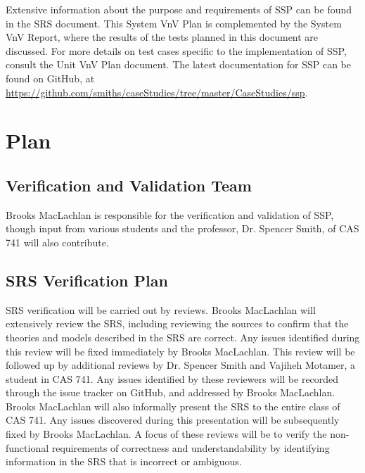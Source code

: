 \documentclass[12pt, titlepage]{article}
\newcommand{\progname}{SSP}
\begin{document}
\noindent Extensive information about the purpose and requirements of 
\progname{} can be found in the SRS document. This System VnV Plan is 
complemented by the System VnV Report, where the results of the tests planned 
in this document are discussed. For more details on test cases specific to the 
implementation of \progname{}, consult the Unit VnV Plan document. The latest 
documentation for \progname{} can be found on GitHub, at \newline 
\href{https://github.com/smiths/caseStudies/tree/master/CaseStudies/ssp}{https://github.com/smiths/caseStudies/tree/master/CaseStudies/ssp}.

\section{Plan} \label{sec_Plan}
	
\subsection{Verification and Validation Team}

\noindent Brooks MacLachlan is responsible for the verification and validation 
of \progname{}, though input from various students and the professor, Dr. 
Spencer 
Smith, of CAS 741 will also contribute.

\subsection{SRS Verification Plan}

\noindent SRS verification will be carried out by reviews. Brooks MacLachlan 
will extensively review the SRS, including reviewing the sources to confirm 
that the theories and models described in the SRS are correct. Any issues 
identified during this review will be fixed immediately by Brooks MacLachlan. 
This review will be followed up by additional reviews by Dr. Spencer Smith and 
Vajiheh Motamer, a student in CAS 741. Any issues identified by these reviewers 
will be recorded through the issue tracker on GitHub, and addressed by Brooks 
MacLachlan. Brooks MacLachlan will also informally present the SRS to the 
entire class of CAS 741. Any issues discovered during this presentation will be 
subsequently fixed by Brooks MacLachlan. A focus of these reviews will be to 
verify the non-functional requirements of correctness and understandability by 
identifying information in the SRS that is incorrect or ambiguous.
\end{document}
